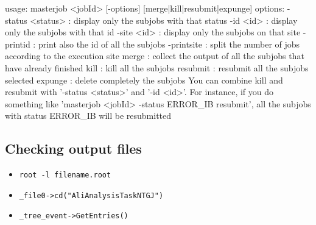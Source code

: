 \documentclass[12pt]{article}
\begin{document}
\begin{tcolorbox}
\begin{verbnobox}[\scriptsize]
usage: masterjob   <jobId> [-options] [merge|kill|resubmit|expunge]
options:
                    -status <status>       :  display only the subjobs with that status
                    -id <id>               :  display only the subjobs with that id
                    -site <id>             :  display only the subjobs on that site
                    -printid               :  print also the id of all the subjobs
                    -printsite             :  split the number of jobs according to the execution site
                    merge                  :  collect the output of all the subjobs that have already finished
                    kill                   :  kill all the subjobs
                    resubmit               :  resubmit all the subjobs selected
                    expunge                :  delete completely the subjobs
                    You can combine kill and resubmit with '-status <status>' and '-id <id>'.
                    For instance, if you do something like 'masterjob <jobId> -status ERROR_IB resubmit',
                     all the subjobs with status ERROR_IB will be resubmitted
\end{verbnobox}
\end{tcolorbox}

\subsection{Checking output files}

\begin{itemize}
\item \verb|root -l filename.root|
\item \verb|_file0->cd("AliAnalysisTaskNTGJ")|
\item \verb|_tree_event->GetEntries()|
\end{itemize}
\end{document}

